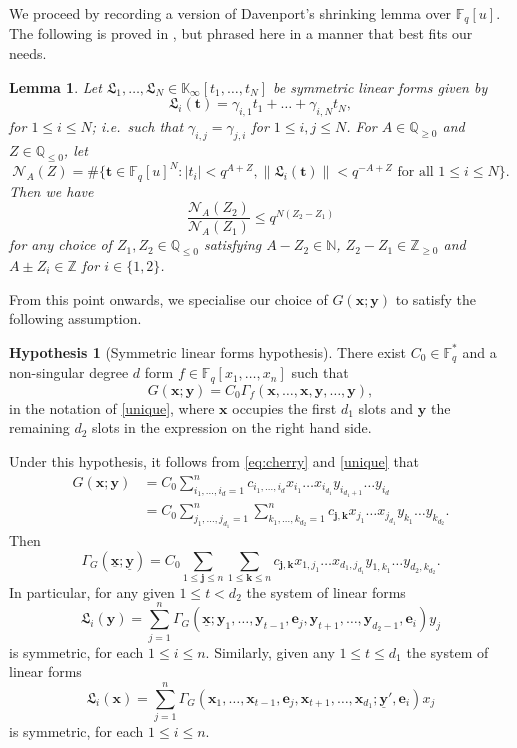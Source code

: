 \documentclass[12pt, reqno]{amsart}
\numberwithin{equation}{section}
\newcommand{\0}{\mathbf{0}}
\newcommand{\FF}{\mathbb{F}}
\newcommand{\NN}{\mathbb{N}}
\newcommand{\QQ}{\mathbb{Q}}
\newcommand{\KK}{\mathbb{K}}
\renewcommand{\leq}{\leqslant}
\renewcommand{\geq}{\geqslant}
\newcommand{\x}{\mathbf{x}}
\newcommand{\y}{\mathbf{y}}
\renewcommand{\k}{\mathbf{k}}
\newcommand{\ee}{\mathbf{e}}
\renewcommand{\=}{\equiv}
\renewcommand{\t}{\mathbf{t}}
\newcommand{\1}{\mathbf{1}}
\newtheorem{lemma}[theorem]{Lemma}
\theoremstyle{definition}
\newtheorem{hyp}[theorem]{Hypothesis}
\begin{document}
We proceed by recording a version of Davenport's shrinking lemma over $\FF_q[u]$. The following is proved in \cite[Lemma 6.4]{BS1}, but phrased here in a manner that best fits our needs.

\begin{lemma}
\label{shrink2}
Let $\mathfrak{L}_1, \dots, \mathfrak{L}_N \in \KK_\infty[t_1, \dots, t_N]$ be symmetric linear forms given by
$$\mathfrak{L}_i(\t) = \gamma_{i,1} t_1 + \dots + \gamma_{i,N} t_N,$$
for $1 \leq i \leq N$; i.e.\ such that $\gamma_{i,j} = \gamma_{j,i}$ for $1 \leq i, j \leq N$.
For  $A \in \QQ_{\geq 0}$ and $Z \in \QQ_{\leq 0}$, let
$$
\mathcal{N}_{A}(Z)
= \#
\{ \t \in  \FF_q[u]^N: |t_i|< q^{A +  Z  }, \| \mathfrak{L}_i(\t) \| < q^{- A +  Z }  \text{ for all $1 \leq i \leq N$} \}.
$$
Then 
we have
$$
\frac{ \mathcal{N}_{A}(Z_2)}{ \mathcal{N}_{A} ( Z_1 )} \leq  q^{ N (  Z_2  -  Z_1 )  }
$$
for any choice of $Z_1, Z_2 \in \QQ_{\leq 0}$ satisfying 
$A - Z_2 \in \NN$, 
$Z_2 - Z_1 \in \mathbb{Z}_{\geq 0}$ and 
$
A \pm Z_i \in \mathbb{Z}$
for $i\in \{1,2\}$.
\end{lemma}


From this point onwards, we specialise our choice of $G(\x; \y)$ to satisfy the  following assumption.
\begin{hyp}[Symmetric linear forms hypothesis]\label{HYP}
There exist $C_0 \in \FF_q^*$ and a non-singular degree $d$ form $f \in \FF_q [x_1, \dots, x_n]$  such that
$$
G(\x ; \y) = C_0 \Gamma_f (\x, \dots, \x, \y, \dots, \y ),
$$
in the notation of \eqref{unique}, 
where $\x$ occupies the first $d_1$ slots and $\y$ the remaining $d_2$ slots in the expression on the right hand side.
\end{hyp}

Under this hypothesis, it follows from \eqref{eq:cherry}  and  \eqref{unique} that
\begin{align*}
G(\x ; \y) &=C_0  \sum_{i_1, \dots, i_d = 1}^n c_{i_1, \dots, i_d} x_{i_1} \dots x_{i_{ d_1 }} y_{i_{ d_1 + 1 }} \dots  y_{i_{ d }}
\\
&= C_0 \sum_{j_1, \dots, j_{d_1} = 1}^n  \sum_{k_1, \dots, k_{d_2} = 1}^n  c_{\mathbf{j}, \k} x_{j_1} \dots x_{j_{ d_1 }} y_{k_{ 1 }} \dots  y_{k_{ d_2 }}.
\end{align*}
Then
$$
\Gamma_G( \underline{\x}; \underline{\y})
=
C_0 \sum_{1 \leq \mathbf{j} \leq n}  \sum_{1 \leq \k \leq n}  c_{\mathbf{j}, \k} x_{1, j_1} \dots x_{d_1, j_{ d_1 }}
y_{1, k_{ 1 }} \dots  y_{d_2, k_{ d_2 }}.
$$
In particular, for any given $1 \leq t < d_2$ the system of linear forms
$$
\mathfrak{L}_i (\y) = \sum_{j=1}^n \Gamma_G( \underline{\x}; \y_{1}, \ldots, \y_{t-1}, \ee_j, \y_{t+1}, \ldots, \y_{d_2 - 1}, \ee_i ) y_j
$$
 is symmetric,
 for each $1 \leq i \leq n$.
 Similarly, given any $1 \leq t \leq d_1$ the system of linear forms
$$
\mathfrak{L}_i (\x) = \sum_{j=1}^n \Gamma_G(\x_{1}, \ldots, \x_{t-1}, \ee_j, \x_{t+1}, \ldots, \x_{d_1} ; \underline{\mathbf{y}}', \ee_i ) x_j
$$
 is symmetric, for each $1 \leq i \leq n$.
\end{document}
